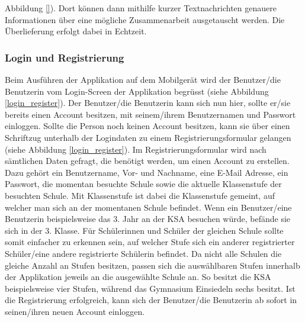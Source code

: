 \documentclass[../main.tex]{subfiles}
\begin{document}
Abbildung \ref{}). Dort können dann mithilfe kurzer Textnachrichten genauere Informationen über eine mögliche Zusammenarbeit ausgetauscht werden. Die Überlieferung erfolgt dabei in Echtzeit.


\subsubsection*{Login und Registrierung}
Beim Ausführen der Applikation auf dem Mobilgerät wird der Benutzer/die Benutzerin vom Login-Screen der Applikation begrüsst (siehe Abbildung \ref{login_register}). Der Benutzer/die Benutzerin kann sich nun hier, sollte er/sie bereits einen Account besitzen, mit seinem/ihrem Benutzernamen und Passwort einloggen. Sollte die Person noch keinen Account besitzen, kann sie über einen Schriftzug unterhalb der Logindaten zu einem Registrierungsformular gelangen (siehe Abbildung \ref{login_register}). Im Registrierungsformular wird nach sämtlichen Daten gefragt, die benötigt werden, um einen Account zu erstellen. Dazu gehört ein Benutzername, Vor- und Nachname, eine E-Mail Adresse, ein Passwort, die momentan besuchte Schule sowie die aktuelle Klassenstufe der besuchten Schule. Mit Klassenstufe ist dabei die Klassenstufe gemeint, auf welcher man sich an der momentanen Schule befindet. Wenn ein Benutzer/eine Benutzerin beispielsweise das 3. Jahr an der KSA besuchen würde, befände sie sich in der 3. Klasse. Für Schülerinnen und Schüler der gleichen Schule sollte somit einfacher zu erkennen sein, auf welcher Stufe sich ein anderer registrierter Schüler/eine andere registrierte Schülerin befindet. Da nicht alle Schulen die gleiche Anzahl an Stufen besitzen, passen sich die auswählbaren Stufen innerhalb der Applikation jeweils an die ausgewählte Schule an. So besitzt die KSA beispielsweise vier Stufen, während das Gymnasium Einsiedeln sechs besitzt. Ist die Registrierung erfolgreich, kann sich der Benutzer/die Benutzerin ab sofort in seinen/ihren neuen Account einloggen.
\end{document}
